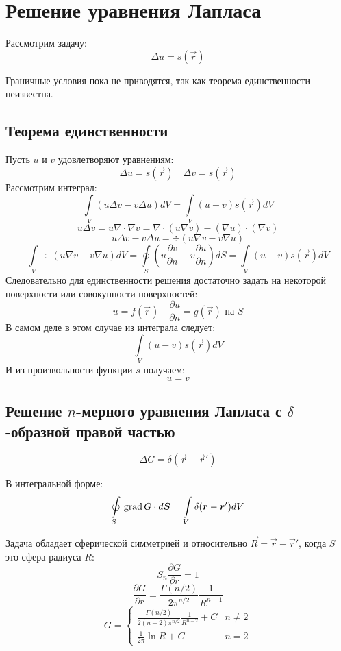 \section{Решение уравнения Лапласа}

Рассмотрим задачу:
\[
	\Delta u = s(\vec{r})
\]

Граничные условия пока не приводятся, так как теорема единственности неизвестна.

\subsection{Теорема единственности}

Пусть $u$ и $v$ удовлетворяют уравнениям:
\[
	\Delta u = s(\vec{r}) \quad \Delta v = s(\vec{r})
\]
Рассмотрим интеграл:
\[
	\int\limits_V (u \Delta v - v \Delta u) dV = \int\limits_V (u - v) s(\vec{r}) dV
\]
\[
	u \Delta v = u \nabla \cdot \nabla v = \nabla \cdot (u \nabla v) - (\nabla u) \cdot (\nabla v)
\]
\[
	u \Delta v - v \Delta u = \div (u \nabla v - v \nabla u)
\]
\[
	\int\limits_V \div (u \nabla v - v \nabla u) dV = 
	\oint\limits_S \left(u \frac{\partial v}{\partial n} - v \frac{\partial u}{\partial n}\right) dS =
	\int\limits_V (u - v) s(\vec{r}) dV
\]
Следовательно для единственности решения достаточно задать на некоторой поверхности или совокупности поверхностей:
\[
	u = f(\vec{r}) \quad \frac{\partial u}{\partial n} = g(\vec{r}) \text{ на } S
\]
В самом деле в этом случае из интеграла следует:
\[
	\int\limits_V (u - v) s(\vec{r}) dV
\]
И из произвольности функции $s$ получаем:
\[
	u = v
\]

\subsection{Решение $n$-мерного уравнения Лапласа с $\delta$-образной правой частью}

\[
	\Delta G = \delta (\vec{r} - \vec{r}')
\]

В интегральной форме:
\[
	\oint\limits_S \,\mathrm{grad}\, G \cdot d\boldsymbol{S} = \int\limits_V \delta (\boldsymbol{r} - \boldsymbol{r}') dV
\]

Задача обладает сферической симметрией и относительно $\vec{R} = \vec{r} - \vec{r}'$, когда $S$ это сфера радиуса $R$:
\[
	S_n \frac{\partial G}{\partial r} = 1
\]
\[
	\frac{\partial G}{\partial r} = \frac{\Gamma(n/2)}{2 \pi^{n/2}} \frac{1}{R^{n - 1}}
\]
\[
	G = 
	\begin{cases}
	\frac{\Gamma(n/2)}{2(n - 2) \pi^{n/2}} \frac{1}{R^{n - 2}} + C & n \ne 2 \\
	\frac{1}{2\pi} \ln R + C & n = 2
	\end{cases}
\]

